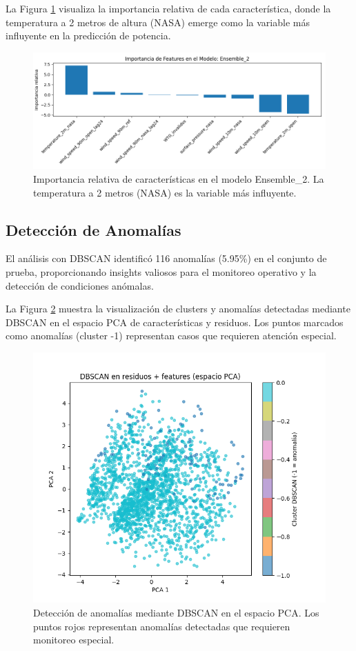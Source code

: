 \documentclass[conference]{IEEEtran}
\begin{document}
	La Figura \ref{fig:importancia_caracteristicas} visualiza la importancia relativa de cada característica, donde la temperatura a 2 metros de altura (NASA) emerge como la variable más influyente en la predicción de potencia.
	
	\begin{figure}[htbp]
		\centering
		\includegraphics[width=0.8\linewidth]{images/Figure_6.png}
		\caption{Importancia relativa de características en el modelo Ensemble\_2. La temperatura a 2 metros (NASA) es la variable más influyente.}
		\label{fig:importancia_caracteristicas}
	\end{figure}
	
	\subsection{Detección de Anomalías}
	El análisis con DBSCAN identificó 116 anomalías (5.95\%) en el conjunto de prueba, proporcionando insights valiosos para el monitoreo operativo y la detección de condiciones anómalas.
	
	La Figura \ref{fig:dbscan_anomalias} muestra la visualización de clusters y anomalías detectadas mediante DBSCAN en el espacio PCA de características y residuos. Los puntos marcados como anomalías (cluster -1) representan casos que requieren atención especial.
	
	\begin{figure}[htbp]
		\centering
		\includegraphics[width=0.8\linewidth]{images/Figure_4.png}
		\caption{Detección de anomalías mediante DBSCAN en el espacio PCA. Los puntos rojos representan anomalías detectadas que requieren monitoreo especial.}
		\label{fig:dbscan_anomalias}
	\end{figure}
	
\end{document}
